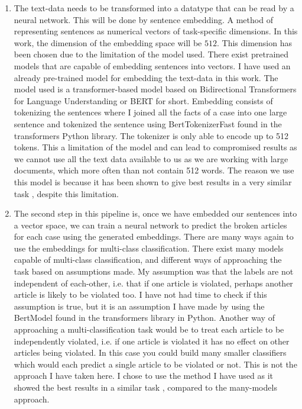 \documentclass{article}
\begin{document}
\begin{enumerate}
    \item The text-data needs to be
        transformed into a datatype that can be read by a neural network.
        This will be done by sentence embedding. 
        A method of representing sentences as numerical vectors of 
        task-specific dimensions. In this work, the dimension of the 
        embedding space will be $512$. This dimension has been chosen due to 
        the limitation of the model used. There exist pretrained models
        that are capable of embedding sentences into vectors. I have
        used an already pre-trained model for embedding the text-data in
        this work. The model used is a transformer-based model
        based on Bidirectional Transformers for Language Understanding 
        \cite{DBLP:journals/corr/abs-1810-04805}
        or BERT for short. Embedding consists of tokenizing the sentences
        where I joined all the facts of a case into one large sentence
        and tokenized the sentence using BertTokenizerFast 
        \cite{DBLP:journals/corr/abs-1810-04805} found in the 
        transformers Python library. The tokenizer is only able to encode
        up to 512 tokens. This a limitation of the model and can lead
        to compromised results as we cannot use all the text data available
        to us as we are working with large documents, which
        more often than not contain 512 words. The reason we use this
        model is because it has been shown to give best results in a 
        very similar task \cite{DBLP:journals/corr/abs-1906-02059}, 
        despite this limitation.

    \item The second step in this pipeline is, once we have embedded our
        sentences into a vector space, we can train a neural network
        to predict the broken articles for each case using the generated 
        embeddings. 
        There are many ways again to use the embeddings for multi-class
        classification. There exist many models capable of multi-class
        classification, and different ways of approaching the task based
        on assumptions made. My assumption was that the labels
        are not independent of each-other, i.e. that if one article is 
        violated, perhaps another article is likely to be violated too.
        I have not had time to check if this assumption is true, but it
        is an assumption I have made 
        by using the BertModel \cite{DBLP:journals/corr/abs-1810-04805} 
        found in the transformers library in Python.
        Another way of approaching a multi-classification task would
        be to treat each article to be independently violated, i.e.
        if one article is violated it has no effect on other articles
        being violated. In this case you could build many smaller
        classifiers which would each predict a single article to
        be violated or not. This is not the approach I have taken here.
        I chose to use the method I have used as it showed the best results
        in a similar task \cite{DBLP:journals/corr/abs-1906-02059}, 
        compared to the many-models approach.
\end{enumerate}
\end{document}
